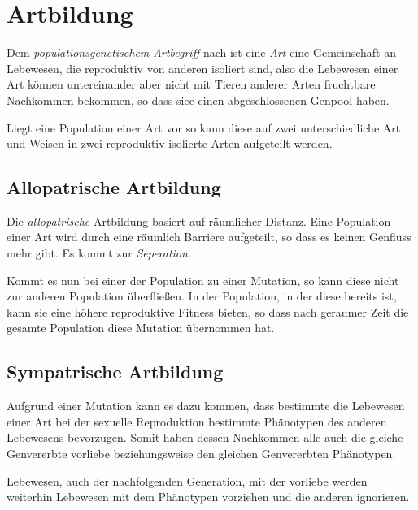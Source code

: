 \documentclass{article}
\begin{document}
\section{Artbildung}
Dem \emph{populationsgenetischem Artbegriff} nach ist eine \emph{Art} eine Gemeinschaft an Lebewesen, die reproduktiv von anderen isoliert sind, also die Lebewesen einer Art können untereinander aber nicht mit Tieren anderer Arten fruchtbare Nachkommen bekommen, so dass siee einen abgeschlossenen Genpool haben.

Liegt eine Population einer Art vor so kann diese auf zwei unterschiedliche Art und Weisen in zwei reproduktiv isolierte Arten aufgeteilt werden.
 
\subsection{Allopatrische Artbildung}
Die \emph{allopatrische} Artbildung basiert auf räumlicher Distanz. Eine Population einer Art wird durch eine räumlich Barriere aufgeteilt, so dass es keinen Genfluss mehr gibt. Es kommt zur \emph{Seperation}.
 
Kommt es nun bei einer der Population zu einer Mutation, so kann diese nicht zur anderen Population überfließen. In der Population, in der diese bereits ist, kann sie eine höhere reproduktive Fitness bieten, so dass nach geraumer Zeit die gesamte Population diese Mutation übernommen hat.
 
\subsection{Sympatrische Artbildung}
Aufgrund einer Mutation kann es dazu kommen, dass bestimmte die Lebewesen einer Art bei der sexuelle Reproduktion bestimmte Phänotypen des anderen Lebewesens bevorzugen. Somit haben dessen Nachkommen alle auch die gleiche Genvererbte vorliebe beziehungsweise den gleichen Genvererbten Phänotypen.
 
Lebewesen, auch der nachfolgenden Generation, mit der vorliebe werden weiterhin Lebewesen mit dem Phänotypen vorziehen und die anderen ignorieren. 
  
\end{document}
